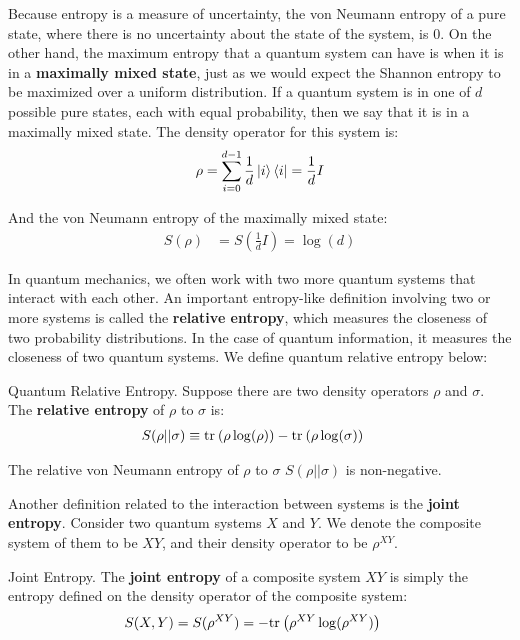 Because entropy is a measure of uncertainty, the von Neumann entropy of a pure state, where there is no uncertainty about the state of the system, is 0. On the other hand, the maximum entropy that a quantum system can have is when it is in a \textbf{maximally mixed state}, just as we would expect the Shannon entropy to be maximized over a uniform distribution. If a quantum system is in one of $d$ possible pure states, each with equal probability, then we say that it is in a maximally mixed state. The density operator for this system is:
\begin{align}
    \rho = \sum_{i=0}^{d-1} \frac{1}{d}\ket{i}\bra{i} = \frac{1}{d} I
\end{align}

And the von Neumann entropy of the maximally mixed state:
\begin{align}
    S(\rho) &= S(\tfrac{1}{d}I) = \log(d)
\end{align}

In quantum mechanics, we often work with two more quantum systems that interact with each other. An important entropy-like definition involving two or more systems is called the \textbf{relative entropy}, which measures the closeness of two probability distributions. In the case of quantum information, it measures the closeness of two quantum systems. We define quantum relative entropy below:

\begin{definition}{Quantum Relative Entropy.}
    Suppose there are two density operators $\rho$ and $\sigma$. The \textbf{relative entropy} of $\rho$ to $\sigma$ is:
    \begin{align}
        S(\rho||\sigma) &\equiv \text{tr}_{}\left( {\rho \log(\rho)} \right) - \text{tr}_{}\left( {\rho \log (\sigma)} \right)
    \end{align}
\end{definition}

\begin{remark}
    The relative von Neumann entropy of $\rho$ to $\sigma$ $S(\rho||\sigma)$ is non-negative.
\end{remark}

Another definition related to the interaction between systems is the \textbf{joint entropy}. Consider two quantum systems $X$ and $Y$. We denote the composite system of them to be $XY$, and their density operator to be $\rho^{XY}$.

\begin{definition}{Joint Entropy.}
    The \textbf{joint entropy} of a composite system $XY$ is simply the entropy defined on the density operator of the composite system:
    \begin{align}
        S(X,Y) = S(\rho^{XY}) &= -\text{tr}_{}\left( {\rho^{XY} \log(\rho^{XY})} \right)
    \end{align}
\end{definition}

